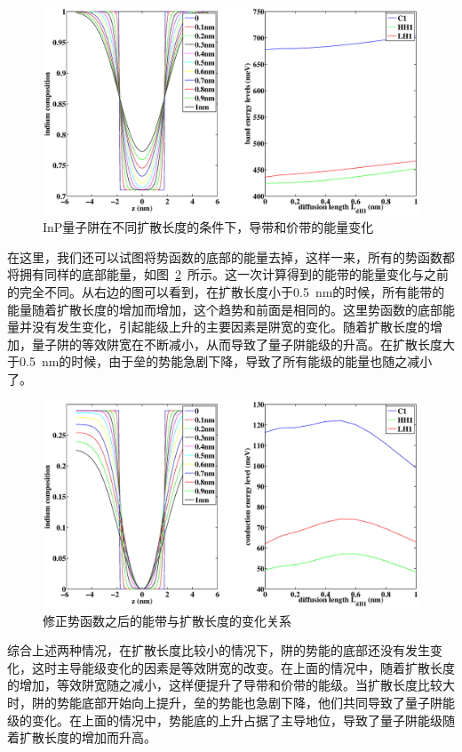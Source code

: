 \documentclass{ZJUthesis}
\begin{document}
\begin{figure}[htbp]
    \centering
    \includegraphics[width=1.0\textwidth]{./Pictures/Ld_1.eps}
    \caption{InP量子阱在不同扩散长度的条件下，导带和价带的能量变化}
    \label{fig_Ld_1}
\end{figure}

在这里，我们还可以试图将势函数的底部的能量去掉，这样一来，所有的势函数都将拥有同样的底部能量，如图~\ref{fig_Ld_2}~所示。这一次计算得到的能带的能量变化与之前的完全不同。从右边的图可以看到，在扩散长度小于0.5~nm的时候，所有能带的能量随着扩散长度的增加而增加，这个趋势和前面是相同的。这里势函数的底部能量并没有发生变化，引起能级上升的主要因素是阱宽的变化。随着扩散长度的增加，量子阱的等效阱宽在不断减小，从而导致了量子阱能级的升高。在扩散长度大于0.5~nm的时候，由于垒的势能急剧下降，导致了所有能级的能量也随之减小了。

\begin{figure}[htbp]
    \centering
    \includegraphics[width=1.0\textwidth]{./Pictures/Ld_2.eps}
    \caption{修正势函数之后的能带与扩散长度的变化关系}
    \label{fig_Ld_2}
\end{figure}

综合上述两种情况，在扩散长度比较小的情况下，阱的势能的底部还没有发生变化，这时主导能级变化的因素是等效阱宽的改变。在上面的情况中，随着扩散长度的增加，等效阱宽随之减小，这样便提升了导带和价带的能级。当扩散长度比较大时，阱的势能底部开始向上提升，垒的势能也急剧下降，他们共同导致了量子阱能级的变化。在上面的情况中，势能底的上升占据了主导地位，导致了量子阱能级随着扩散长度的增加而升高。
\end{document}
